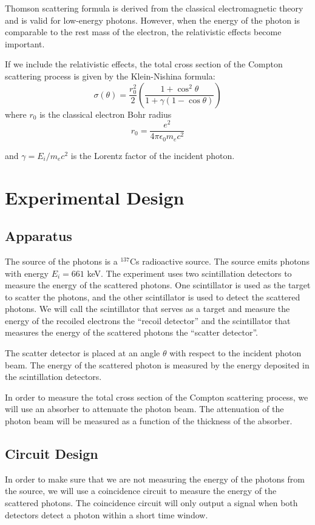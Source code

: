 Thomson scattering formula is derived from the classical electromagnetic theory and is valid for low-energy photons. However, when the energy of the photon is comparable to the rest mass of the electron, the relativistic effects become important.

If we include the relativistic effects, the total cross section of the Compton scattering process is given by the Klein-Nishina formula:
\begin{equation}
\sigma(\theta) = \frac{r_0^2}{2} \left( \frac{1 + \cos^2\theta}{1 + \gamma(1 - \cos\theta)} \right)
\end{equation}
where $r_0$ is the classical electron Bohr radius 
\begin{equation}
r_0 = \frac{e^2}{4\pi\epsilon_0 m_e c^2}
\end{equation}

and $\gamma = E_i/m_e c^2$ is the Lorentz factor of the incident photon.

\section{Experimental Design}
\subsection{Apparatus}
The source of the photons is a $^{137}$Cs radioactive source. The source emits photons with energy $E_i = 661$ keV. The experiment uses two scintillation detectors to measure the energy of the scattered photons. One scintillator is used as the target to scatter the photons, and the other scintillator is used to detect the scattered photons. We will call the scintillator that serves as a target and measure the energy of the recoiled electrons the ``recoil detector'' and the scintillator that measures the energy of the scattered photons the ``scatter detector''.

The scatter detector is placed at an angle $\theta$ with respect to the incident photon beam. The energy of the scattered photon is measured by the energy deposited in the scintillation detectors. 

In order to measure the total cross section of the Compton scattering process, we will use an absorber to attenuate the photon beam. The attenuation of the photon beam will be measured as a function of the thickness of the absorber.

\subsection{Circuit Design}
In order to make sure that we are not measuring the energy of the photons from the source, we will use a coincidence circuit to measure the energy of the scattered photons. The coincidence circuit will only output a signal when both detectors detect a photon within a short time window. 

